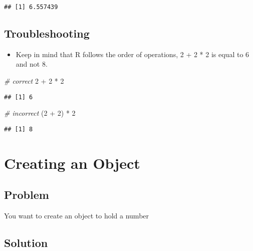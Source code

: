 \documentclass[]{book}
\newenvironment{Shaded}{\begin{snugshade}}{\end{snugshade}}
\newcommand{\DecValTok}[1]{\textcolor[rgb]{0.00,0.00,0.81}{{#1}}}
\newcommand{\StringTok}[1]{\textcolor[rgb]{0.31,0.60,0.02}{{#1}}}
\newcommand{\CommentTok}[1]{\textcolor[rgb]{0.56,0.35,0.01}{\textit{{#1}}}}
\newcommand{\NormalTok}[1]{{#1}}
\providecommand{\tightlist}{%
  \setlength{\itemsep}{0pt}\setlength{\parskip}{0pt}}
\begin{document}
\begin{verbatim}
## [1] 6.557439
\end{verbatim}

\subsection{Troubleshooting}\label{troubleshooting}

\begin{itemize}
\tightlist
\item
  Keep in mind that R follows the order of operations, 2 + 2 * 2 is
  equal to 6 and not 8.
\end{itemize}

\begin{Shaded}
\begin{Highlighting}[]
\CommentTok{# correct}
\DecValTok{2} \NormalTok{+}\StringTok{ }\DecValTok{2} \NormalTok{*}\StringTok{ }\DecValTok{2}
\end{Highlighting}
\end{Shaded}

\begin{verbatim}
## [1] 6
\end{verbatim}

\begin{Shaded}
\begin{Highlighting}[]
\CommentTok{# incorrect}
\NormalTok{(}\DecValTok{2} \NormalTok{+}\StringTok{ }\DecValTok{2}\NormalTok{) *}\StringTok{ }\DecValTok{2}
\end{Highlighting}
\end{Shaded}

\begin{verbatim}
## [1] 8
\end{verbatim}

\section{Creating an Object}\label{object}

\subsection{Problem}\label{problem-1}

You want to create an object to hold a number

\subsection{Solution}\label{solution-1}
\end{document}
